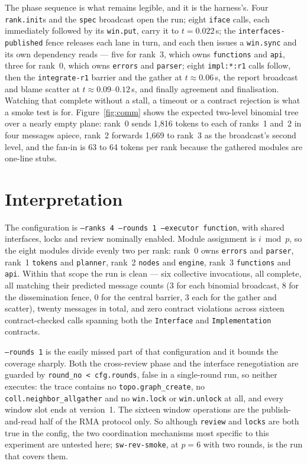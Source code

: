 \documentclass[11pt]{article}
\begin{document}
The phase sequence is what remains legible, and it is the harness's. Four \texttt{rank.init}s
and the \texttt{spec} broadcast open the run; eight \texttt{iface} calls, each immediately
followed by its \texttt{win.put}, carry it to $t = 0.022$\,s; the
\texttt{interfaces-published} fence releases each lane in turn, and each then issues a
\texttt{win.sync} and its own dependency reads --- five for rank~3, which owns
\texttt{functions} and \texttt{api}, three for rank~0, which owns \texttt{errors} and
\texttt{parser}; eight \texttt{impl:*:r1} calls follow, then the \texttt{integrate-r1} barrier
and the gather at $t \approx 0.06$\,s, the report broadcast and blame scatter at
$t \approx 0.09$--$0.12$\,s, and finally agreement and finalisation. Watching that complete
without a stall, a timeout or a contract rejection is what a smoke test is for.
Figure~\ref{fig:comm} shows the expected two-level binomial tree over a nearly empty plane:
rank~0 sends 1{,}816 tokens to each of ranks~1 and~2 in four messages apiece, rank~2 forwards
1{,}669 to rank~3 as the broadcast's second level, and the fan-in is 63 to 64 tokens per rank
because the gathered modules are one-line stubs.

\section{Interpretation}

The configuration is \texttt{--ranks 4 --rounds 1 --executor function}, with shared interfaces,
locks and review nominally enabled. Module assignment is $i \bmod p$, so the eight modules
divide evenly two per rank: rank~0 owns \texttt{errors} and \texttt{parser}, rank~1
\texttt{tokens} and \texttt{planner}, rank~2 \texttt{nodes} and \texttt{engine}, rank~3
\texttt{functions} and \texttt{api}. Within that scope the run is clean --- six collective
invocations, all complete, all matching their predicted message counts (3 for each binomial
broadcast, 8 for the dissemination fence, 0 for the central barrier, 3 each for the gather and
scatter), twenty messages in total, and zero contract violations across sixteen
contract-checked calls spanning both the \texttt{Interface} and \texttt{Implementation}
contracts.

\texttt{--rounds 1} is the easily missed part of that configuration and it bounds the coverage
sharply. Both the cross-review phase and the interface renegotiation are guarded by
\texttt{round\_no < cfg.rounds}, false in a single-round run, so neither executes: the trace
contains no \texttt{topo.graph\_create}, no \texttt{coll.neighbor\_allgather} and no
\texttt{win.lock} or \texttt{win.unlock} at all, and every window slot ends at version~1. The
sixteen window operations are the publish-and-read half of the RMA protocol only. So although
\texttt{review} and \texttt{locks} are both true in the config, the two coordination mechanisms
most specific to this experiment are untested here; \texttt{sw-rev-smoke}, at $p = 6$ with two
rounds, is the run that covers them.
\end{document}
